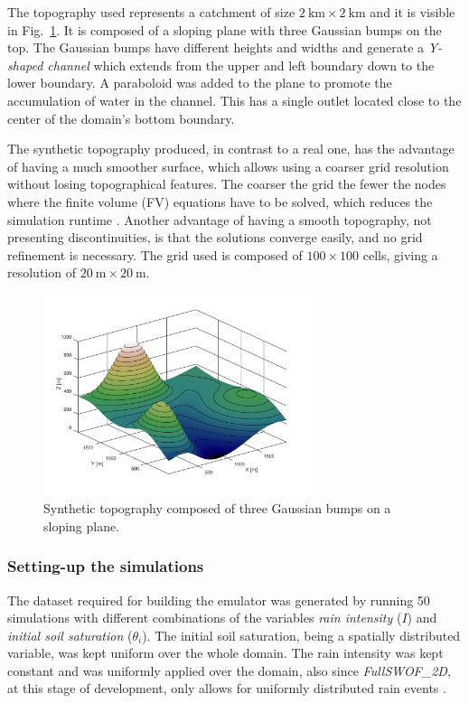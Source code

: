 The topography used represents a catchment of size $\SI{2}{\kilo\meter} \times \SI{2}{\kilo\meter}$ and it is visible in Fig.~\ref{fig:topography}.
It is composed of a sloping plane with three Gaussian bumps on the top.
The Gaussian bumps have different heights and widths and generate a \emph{Y-shaped channel} which extends from the upper and left boundary down to the lower boundary.
A paraboloid was added to the plane to promote the accumulation of water in the channel.
This has a single outlet located close to the center of the domain's bottom boundary.

The synthetic topography produced, in contrast to a real one, has the advantage of having a much smoother surface, which allows using a coarser grid resolution without losing topographical features.
The coarser the grid the fewer the nodes where the finite volume (FV) equations have to be solved, which reduces the simulation runtime . 
Another advantage of having a smooth topography, not presenting discontinuities, is that the solutions converge easily, and no grid refinement is necessary.
The grid used is composed of $\num{100} \times \num{100}$ cells, giving a resolution of $\SI{20}{\meter} \times \SI{20}{\meter}.$

\begin{figure}[h]
  \centering
  \includegraphics[width=0.7\textwidth]{Figures/topography.png}
  \caption{Synthetic topography composed of three Gaussian bumps on a sloping plane.}
  \label{fig:topography}
\end{figure}

\subsubsection{Setting-up the simulations}
The dataset required for building the emulator was generated by running \num{50} simulations with different combinations of the variables \emph{rain intensity} ($I$) and \emph{initial soil saturation} ($\theta_i$).
The initial soil saturation, being a spatially distributed variable, was kept uniform over the whole domain.
The rain intensity was kept constant and was uniformly applied over the domain, also since \textit{FullSWOF\_2D}, at this stage of development, only allows for uniformly distributed rain events \autocite{laguerre_documentation_2016}.

